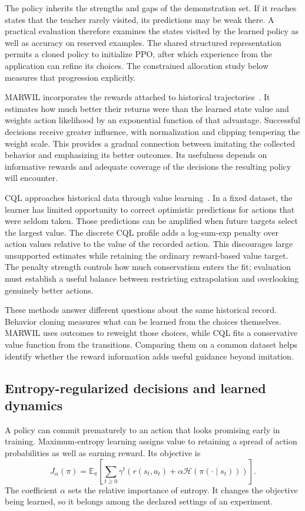 \documentclass{strategynet-journal}
\newcommand{\E}{\mathbb{E}}
\begin{document}
The policy inherits the strengths and gaps of the demonstration set. If it
reaches states that the teacher rarely visited, its predictions may be weak
there. A practical evaluation therefore examines the states visited by the
learned policy as well as accuracy on reserved examples. The shared structured
representation permits a cloned policy to initialize PPO, after which
experience from the application can refine its choices. The constrained
allocation study below measures that progression explicitly.

MARWIL incorporates the rewards attached to historical trajectories~\cite{marwil}.
It estimates how much better their returns were than the learned state value
and weights action likelihood by an exponential function of that advantage.
Successful decisions receive greater influence, with normalization and
clipping tempering the weight scale. This provides a gradual connection
between imitating the collected behavior and emphasizing its better outcomes.
Its usefulness depends on informative rewards and adequate coverage of the
decisions the resulting policy will encounter.

CQL approaches historical data through value learning~\cite{cql}. In a fixed
dataset, the learner has limited opportunity to correct optimistic predictions
for actions that were seldom taken. Those predictions can be amplified when
future targets select the largest value. The discrete CQL profile adds a
log-sum-exp penalty over action values relative to the value of the recorded
action. This discourages large unsupported estimates while retaining the
ordinary reward-based value target. The penalty strength controls how much
conservatism enters the fit; evaluation must establish a useful balance between
restricting extrapolation and overlooking genuinely better actions.

These methods answer different questions about the same historical record.
Behavior cloning measures what can be learned from the choices themselves.
MARWIL uses outcomes to reweight those choices, while CQL fits a conservative
value function from the transitions. Comparing them on a common dataset helps
identify whether the reward information adds useful guidance beyond imitation.

\subsection{Entropy-regularized decisions and learned dynamics}

A policy can commit prematurely to an action that looks promising early in
training. Maximum-entropy learning assigns value to retaining a spread of
action probabilities as well as earning reward. Its objective is
\[
 J_\alpha(\pi)=\E_\pi\left[
   \sum_{t\geq0}\gamma^t
   \left(r(s_t,a_t)+\alpha\mathcal H(\pi(\cdot\mid s_t))\right)
 \right].
\]
The coefficient $\alpha$ sets the relative importance of entropy. It changes
the objective being learned, so it belongs among the declared settings of an
experiment.
\end{document}
